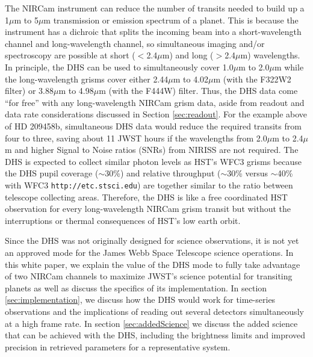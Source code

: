 \documentclass[iop]{emulateapj}
\begin{document}

The NIRCam instrument can reduce the number of transits needed to build up a 1$\mu$m to 5$\mu$m transmission or emission spectrum of a planet.
This is because the instrument has a dichroic that splits the incoming beam into a short-wavelength channel and long-wavelength channel, so simultaneous imaging and/or spectroscopy are possible at short ($<$2.4$\mu$m) and long ($>$2.4$\mu$m) wavelengths.
In principle, the DHS can be used to simultaneously cover 1.0$\mu$m to 2.0$\mu$m while the long-wavelength grisms cover either 2.44$\mu$m to 4.02$\mu$m (with the F322W2 filter) or 3.88$\mu$m to 4.98$\mu$m (with the F444W) filter.
Thus, the DHS data come ``for free'' with any long-wavelength NIRCam grism data, aside from readout and data rate considerations discussed in Section \ref{sec:readout}.
For the example above of HD 209458b, simultaneous DHS data would reduce the required transits from four to three, saving about 11 JWST hours 
if the wavelengths from 2.0$\mu$m to 2.4$\mu$m and higher Signal to Noise ratios (SNRs) from NIRISS are not required.
The DHS is expected to collect similar photon levels as HST's WFC3 grisms because the DHS pupil coverage ($\sim$30\%) and relative throughput ($\sim$30\% versus $\sim$40\% with WFC3 \texttt{http://etc.stsci.edu}) are together similar to the ratio between telescope collecting areas.
Therefore, the DHS is like a free coordinated HST observation for every long-wavelength NIRCam grism transit but without the interruptions or thermal consequences of HST's low earth orbit.

Since the DHS was not originally designed for science observations, it is not yet an approved mode for the James Webb Space Telescope science operations.
In this white paper, we explain the value of the DHS mode to fully take advantage of two NIRCam channels to maximize JWST's science potential for transiting planets as well as discuss the specifics of its implementation.
In section \ref{sec:implementation}, we discuss how the DHS would work for time-series observations and the implications of reading out several detectors simultaneously at a high frame rate.
In section \ref{sec:addedScience} we discuss the added science that can be achieved with the DHS, including the brightness limits and improved precision in retrieved parameters for a representative system.
\end{document}
